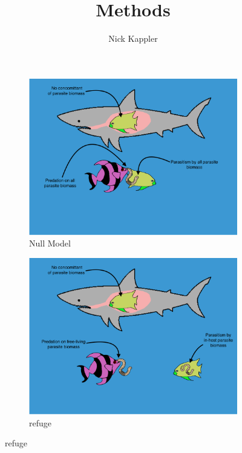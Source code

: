\documentclass[11pt]{amsart}
\title{Methods}
\author{Nick Kappler}
\begin{document}
\begin{figure}
\begin{subfigure}{.45\textwidth}
\caption{Null Model\label{subfig:modelsA}}
\includegraphics[width=\textwidth]{../figures/Null.png}
\end{subfigure}
\begin{subfigure}{.45\textwidth}
\caption{refuge\label{subfig:modelsB}}
\includegraphics[width=\textwidth]{../figures/Null+Ref.png}
\end{subfigure}


\end{figure}
\end{document}
